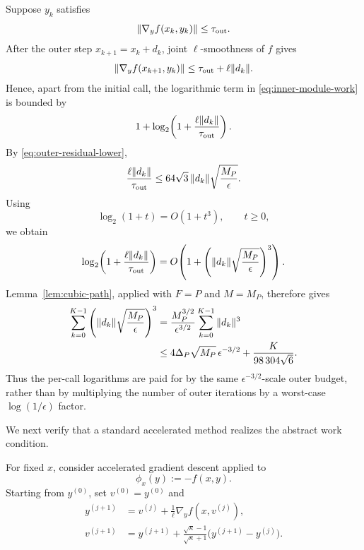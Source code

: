 Suppose $y_k$ satisfies
\[
    \|\nabla_yf(x_k,y_k)\|
    \le
    \tau_{\rm out}.
\]
After the outer step $x_{k+1}=x_k+d_k$, joint
$\ell$-smoothness of $f$ gives
\begin{equation}
    \|\nabla_yf(x_{k+1},y_k)\|
    \le
    \tau_{\rm out}
    +
    \ell\|d_k\|.
    \label{eq:warm-start-residual}
\end{equation}
Hence, apart from the initial call, the logarithmic term in
\eqref{eq:inner-module-work} is bounded by
\begin{equation}
    1+
    \log_2\!\left(
        1+
        \frac{\ell\|d_k\|}{\tau_{\rm out}}
    \right).
    \label{eq:inner-log-per-call}
\end{equation}
By \eqref{eq:outer-residual-lower},
\begin{equation}
    \frac{\ell\|d_k\|}{\tau_{\rm out}}
    \le
    64\sqrt3\,
    \|d_k\|
    \sqrt{\frac{M_P}{\epsilon}}.
    \label{eq:inner-log-scale}
\end{equation}
Using
\[
    \log_2(1+t)=O(1+t^3),
    \qquad t\ge0,
\]
we obtain
\begin{equation}
    \log_2\!\left(
        1+
        \frac{\ell\|d_k\|}{\tau_{\rm out}}
    \right)
    =
    O\!\left(
        1+
        \left(
            \|d_k\|
            \sqrt{\frac{M_P}{\epsilon}}
        \right)^3
    \right).
    \label{eq:inner-log-cubic}
\end{equation}
Lemma~\ref{lem:cubic-path}, applied with $F=P$ and $M=M_P$,
therefore gives
\begin{align}
    \sum_{k=0}^{K-1}
    \left(
        \|d_k\|
        \sqrt{\frac{M_P}{\epsilon}}
    \right)^3
    &=
    \frac{M_P^{3/2}}{\epsilon^{3/2}}
    \sum_{k=0}^{K-1}\|d_k\|^3
    \notag\\
    &\le
    4\Delta_P\sqrt{M_P}\,
    \epsilon^{-3/2}
    +
    \frac{K}{98\,304\sqrt6}.
    \label{eq:inner-log-sum}
\end{align}
Thus the per-call logarithms are paid for by the same
$\epsilon^{-3/2}$-scale outer budget, rather than by multiplying the
number of outer iterations by a worst-case
$\log(1/\epsilon)$ factor.

We next verify that a standard accelerated method realizes the
abstract work condition.

For fixed $x$, consider accelerated gradient descent applied to
\[
    \phi_x(y):=-f(x,y).
\]
Starting from $y^{(0)}$, set $v^{(0)}=y^{(0)}$ and
\begin{equation}
\begin{aligned}
    y^{(j+1)}
    &=
    v^{(j)}
    +
    \frac1\ell
    \nabla_yf(x,v^{(j)}),
    \\
    v^{(j+1)}
    &=
    y^{(j+1)}
    +
    \frac{\sqrt\kappa-1}{\sqrt\kappa+1}
    \bigl(y^{(j+1)}-y^{(j)}\bigr).
\end{aligned}
\label{eq:agd-recursion}
\end{equation}

